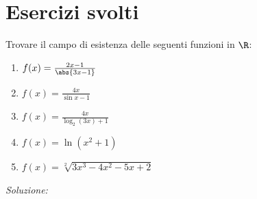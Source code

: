 \documentclass[a4paper, 12pt]{report}
\begin{document}
    \newpage

    \section{Esercizi svolti}

    \begin{framedprob}{}
        Trovare il campo di esistenza delle seguenti funzioni in $\R$:
        \begin{enumerate}
            \item $f(x) = \frac{2x-1}{\abs{3x-1}}$
            \item $f(x) = \frac{4x}{\sin x - 1}$
            \item $f(x) = \frac{4x}{\log_2(3x) + 1}$
            \item $f(x) = \ln(x^2+1)$
            \item $f(x) = \sqrt[2]{3 x^3 - 4 x^2 - 5 x + 2}$
        \end{enumerate}
    \end{framedprob}

    \textit{Soluzione:}
\end{document}
